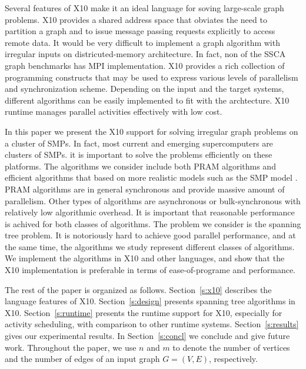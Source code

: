  Several features of X10 make it an ideal language for soving large-scale graph problems. X10 provides a shared address space that obviates the need to partition a graph and to issue message passing requests explicitly to access remote data. It would be very difficult to implement a graph algorithm with irregular inputs on districuted-memory architecture.  In fact, non of the SSCA graph benchmarks has MPI implementation. X10 provides a rich collection of programming constructs that may be used to express various levels of parallelism and synchronization scheme. Depending on the input and the target systems, different algorithms can be easily implemented to fit with the archtecture. X10 runtime manages parallel activities effectively with low cost.

 In this paper we present the X10 support for solving irregular graph problems on a cluster of SMPs. In fact, most current and emerging supercomputers are clusters of SMPs. it is important to solve the problems efficiently on these platforms. The algorithms we consider include both PRAM algorithms and efficient algorithms that based on more realistic models such as the SMP model \cite{HJ}. PRAM algorithms are in general synchronous and provide massive amount of parallelism. Other types of algorithms are asynchronous or bulk-synchronous with relatively low algorithmic overhead.  It is important that reasonable performance is achived for both classes of algorithms. 
The problem we consider is the spanning tree problem. It is notoriously hard to achieve good parallel performance, and at the same time, the algorithms we study represent different classes of algorithms. We implement the algorithms in X10 and other languages, and show that the X10 implementation is preferable in terms of ease-of-programe and performance.

 The rest of the paper is organized as follows. Section~\ref{s:x10} describes the language features of X10. Section~\ref{s:design} presents spanning tree algorithms in X10. Section~\ref{s:runtime} presents the runtime support for X10, especially for activity scheduling, with comparison to other runtime systems. 
 Section~\ref{s:results} gives our experimental results. In Section~\ref{s:concl} we conclude and give future work. 
 Throughout the paper, we
 use $n$ and $m$ to denote the number of vertices and the number of
 edges of an input graph $G=(V,E)$, respectively. 
  


